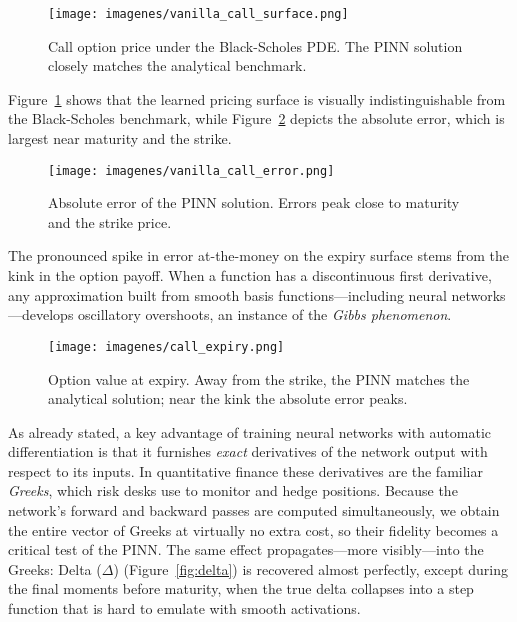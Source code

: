 \documentclass[12pt]{report} %
\theoremstyle{plain} %
\theoremstyle{definition} %
\theoremstyle{remark} %
\begin{document}
\begin{figure}[H]
 \centering
 \texttt{[image: imagenes/vanilla\_call\_surface.png]}
 \caption{Call option price under the Black-Scholes PDE. The PINN solution closely matches the analytical 
	benchmark.}
 \label{fig:call_option}
\end{figure}

Figure~\ref{fig:call_option} shows that the learned pricing surface is visually indistinguishable from the 
Black-Scholes benchmark, while Figure~\ref{fig:call_option_error} depicts the absolute error, which is largest 
near maturity and the strike.

\begin{figure}[H]
 \centering
 \texttt{[image: imagenes/vanilla\_call\_error.png]}
 \caption{Absolute error of the PINN solution. Errors peak close to maturity and the strike price.}
 \label{fig:call_option_error}
\end{figure}

The pronounced spike in error at-the-money on the expiry surface
stems from the kink in the option payoff.
When a function has a discontinuous first derivative, any
approximation built from smooth basis functions—including neural
networks—develops oscillatory overshoots, an instance of the
\emph{Gibbs phenomenon}.

\begin{figure}[H]
  \centering
  \texttt{[image: imagenes/call\_expiry.png]}
  \caption{Option value at expiry.
           Away from the strike, the PINN matches the analytical solution;
           near the kink the absolute error peaks.}
  \label{fig:call_option_expiry}
\end{figure}

As already stated, a key advantage of training neural networks with automatic
differentiation is that it furnishes \emph{exact} derivatives of the network
output with respect to its inputs.  
In quantitative finance these derivatives are the familiar
\emph{Greeks}, which risk desks use to monitor and hedge positions. Because the network's 
forward and backward passes are computed
simultaneously, we obtain the entire vector of Greeks at virtually no extra cost,
so their fidelity becomes a critical test of the PINN.
The same effect propagates—more visibly—into the Greeks:
Delta ($\Delta$) (Figure~\ref{fig:delta}) is recovered almost perfectly,
except during the final moments before maturity, when the true delta collapses
into a step function that is hard to emulate with smooth activations.
\end{document}
